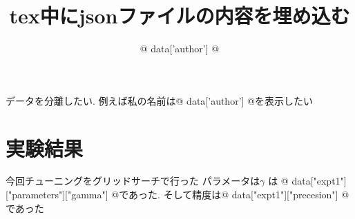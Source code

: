 \documentclass[uplatex]{jsarticle}
\begin{document}
\title{tex中にjsonファイルの内容を埋め込む} 
\author{
    {@ data['author'] @}
}
\maketitle

データを分離したい.
例えば私の名前は{@ data['author'] @}を表示したい


\section{実験結果}
今回チューニングをグリッドサーチで行った
パラメータは$\gamma$ は {@ data["expt1"]["parameters"]["gamma"] @}であった.
そして精度は{@ data["expt1"]["precesion"] @}であった
\end{document}
